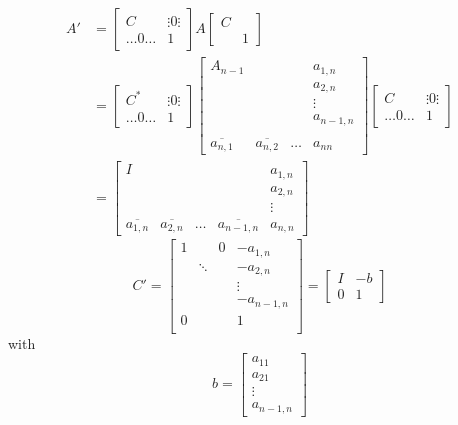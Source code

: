 \documentclass{article}
\begin{document}
\begin{align*}  %
  A' &= \begin{bmatrix}
    C & \vdots 0 \vdots \\
    \ldots 0 \ldots & 1
  \end{bmatrix}
  A
  \begin{bmatrix}
    C & \\
    & 1
  \end{bmatrix} \\
  &= \begin{bmatrix}
    C^* & \vdots 0 \vdots \\
    \ldots 0 \ldots & 1
  \end{bmatrix} \begin{bmatrix}
    A_{n-1} & & & a_{1, n} \\
            & & & a_{2, n} \\
            & & & \vdots \\
            & & & a_{n-1,n} \\ \\
    \overline{a_{n,1}} & \overline{a_{n,2}} & \ldots & a_{nn}
  \end{bmatrix} \begin{bmatrix}
    C & \vdots 0 \vdots \\
    \ldots 0 \ldots & 1
  \end{bmatrix} \\
  &= \begin{bmatrix}
    I & & & & a_{1,n} \\
      & & & & a_{2,n} \\
      & & & & \vdots \\
    \overline{a_{1,n}} & \overline{a_{2,n}} & \ldots & \overline{a_{n-1,n}} & a_{n,n}
  \end{bmatrix}
\end{align*}
\[
  C' = \begin{bmatrix}
    1 &  & 0 & -a_{1,n} \\
      & \ddots &  & -a_{2,n} \\
      &        &  & \vdots \\
      &        &  & -a_{n-1,n} \\
    0 &        &  & 1 \\
  \end{bmatrix}
  = \left[
    \begin{array}{c|c}
      I & -b \\
      \hline
      0 & 1
    \end{array}
  \right]
\]
with
\[
  b = \begin{bmatrix} a_{11} \\ a_{21} \\ \vdots \\ a_{n-1,n} \end{bmatrix}
\]
\end{document}
